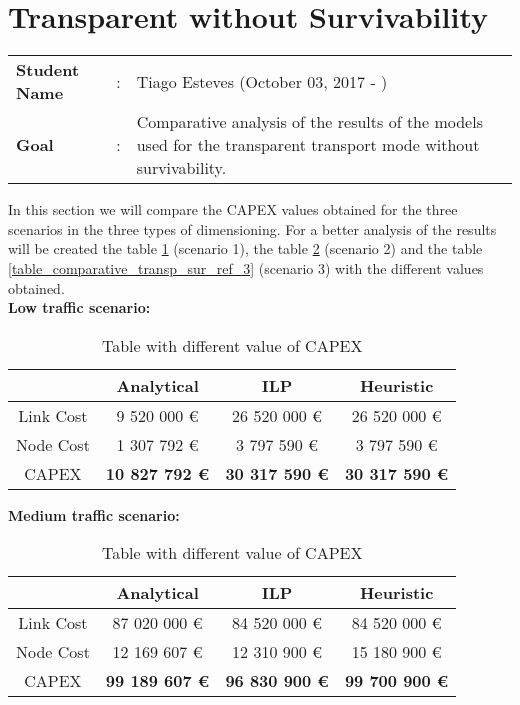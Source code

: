 \clearpage

\section{Transparent without Survivability}\label{comparative_Transp_Survivability}
\begin{tcolorbox}	
\begin{tabular}{p{2.75cm} p{0.2cm} p{10.5cm}} 	
\textbf{Student Name}  &:& Tiago Esteves    (October 03, 2017 - )\\
\textbf{Goal}          &:& Comparative analysis of the results of the models used for the transparent transport mode without survivability.
\end{tabular}
\end{tcolorbox}
\vspace{11pt}


In this section we will compare the CAPEX values obtained for the three scenarios in the three types of dimensioning. For a better analysis of the results will be created the table \ref{table_comparative_transp_sur_ref_1} (scenario 1), the table \ref{table_comparative_transp_sur_ref_2} (scenario 2) and the table \ref{table_comparative_transp_sur_ref_3} (scenario 3) with the different values obtained.\\

\textbf{Low traffic scenario:}\\

\begin{table}[h!]
\centering
\begin{tabular}{| c | c | c | c |}
 \hline
   & Analytical & ILP & Heuristic \\
 \hline\hline
 Link Cost & 9 520 000 \euro & 26 520 000 \euro & 26 520 000 \euro \\
 Node Cost & 1 307 792 \euro & 3 797 590 \euro & 3 797 590 \euro \\
 CAPEX & \textbf{10 827 792 \euro} & \textbf{30 317 590 \euro} & \textbf{30 317 590 \euro} \\
 \hline
\end{tabular}
\caption{Table with different value of CAPEX }
\label{table_comparative_transp_sur_ref_1}
\end{table}


\vspace{11pt}
\textbf{Medium traffic scenario:}\\

\begin{table}[h!]
\centering
\begin{tabular}{| c | c | c | c |}
 \hline
   & Analytical & ILP & Heuristic \\
 \hline\hline
 Link Cost & 87 020 000 \euro & 84 520 000 \euro & 84 520 000 \euro \\
 Node Cost & 12 169 607 \euro & 12 310 900 \euro & 15 180 900 \euro \\
 CAPEX & \textbf{99 189 607 \euro} & \textbf{96 830 900 \euro} & \textbf{99 700 900 \euro} \\
 \hline
\end{tabular}
\caption{Table with different value of CAPEX }
\label{table_comparative_transp_sur_ref_2}
\end{table}


